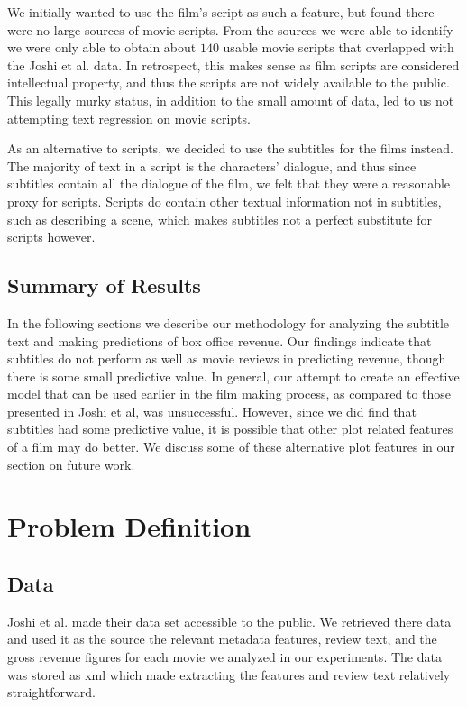 \documentclass[11pt]{article}
\begin{document}
We initially wanted to use the film's script as such a feature, but found 
there were no large sources of movie scripts.
From the sources we were able to identify we were only able to
obtain about $140$ usable movie scripts that overlapped with the Joshi et al. data. 
In retrospect, this makes sense as film scripts are considered
intellectual property, and thus the scripts are not widely available to the public.
This legally murky status, in addition to the small amount of data, led to us not
attempting text regression on movie scripts.

As an alternative to scripts, we decided to use the subtitles for the films instead. The
majority of text in a script is the characters' dialogue, and thus since subtitles contain
all the dialogue of the film, we felt that they were a reasonable proxy for scripts.
Scripts do contain other textual information not in subtitles, such as describing a scene,
which makes subtitles not a perfect substitute for scripts however.

\subsection{Summary of Results}
In the following sections we describe our methodology for analyzing the subtitle text
and making predictions of box office revenue. Our findings indicate that subtitles do
not perform as well as movie reviews in predicting revenue, though there is some small
predictive value. In general, our attempt to create an effective model that can be used
earlier in the film making process, as compared to those presented in Joshi et al, was 
unsuccessful. However, since we did find that subtitles had some predictive value, it 
is possible that other plot related features of a film may do better. We discuss some of
these alternative plot features in our section on future work.

\section{Problem Definition}
\subsection{Data}
Joshi et al. made their data set accessible to the public. We retrieved there data
and used it as the source the relevant metadata features, review text, and the gross revenue figures for each movie we analyzed in our experiments. The data was stored as
xml which made extracting the features and review text relatively straightforward.
\end{document}

